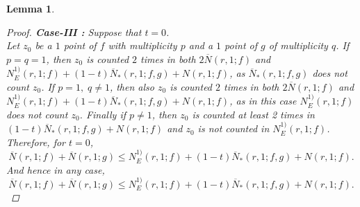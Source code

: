 \documentclass[a4paper,draft]{amsproc}
\theoremstyle{plain}
\newtheorem{lem}{Lemma}[section]
\theoremstyle{definition}
\theoremstyle{remark}
\newcommand{\ol}{\overline}
\numberwithin{equation}{section}
\renewcommand{\leq}{\leqslant}\renewcommand{\geq}{\geqslant}
\begin{document}
\begin{lem}
\begin{proof}
{\bf Case-III :} Suppose that $t=0$.\\
Let $z_0$ be a $1$ point of $f$ with multiplicity $p$ and a $1$ point of $g$ of multiplicity $q$. If $p=q=1$, then $z_0$ is counted $2$ times in both $2\ol N(r,1;f)$ and $N_{E}^{1)}(r,1;f)+\left(1-t\right) \ol N_{*}(r,1;f,g)+N(r,1;f)$, as $\ol N_{*}(r,1;f,g)$ does not count $z_0$. If $p=1,\;q\neq 1$, then also $z_0$ is counted $2$ times in both $2\ol N(r,1;f)$ and\\ $N_{E}^{1)}(r,1;f)+\left(1-t\right)\ol N_{*}(r,1;f,g)+N(r,1;f)$, as in this case $N_{E}^{1)}(r,1;f)$ does not count $z_0$. Finally if $p\neq 1$, then $z_0$ is counted at least 2 times in $\left(1-t\right) \ol N_{*}(r,1;f,g)+N(r,1;f)$ and $z_0$ is not counted in $N_{E}^{1)}(r,1;f)$.\\
Therefore, for $t=0$, $$\ol N(r,1;f)+\ol N(r,1;g)\leq N_{E}^{1)}(r,1;f)+\left(1-t\right) \ol N_{*}(r,1;f,g)+N(r,1;f).$$
And hence in any case,	$$\ol N(r,1;f)+\ol N(r,1;g)\leq N_{E}^{1)}(r,1;f)+\left(1-t\right) \ol N_{*}(r,1;f,g)+N(r,1;f).$$


\end{proof}
\end{lem}
\end{document}
